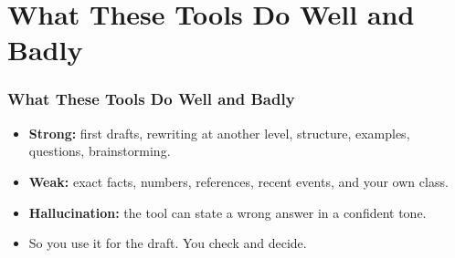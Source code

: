 



\section[Limits]{What These Tools Do Well and Badly}

\begin{frame}[fragile]\frametitle{What These Tools Do Well and Badly}
\begin{itemize}
\item \textbf{Strong:} first drafts, rewriting at another level, structure, examples, questions, brainstorming.
\item \textbf{Weak:} exact facts, numbers, references, recent events, and your own class.
\item \textbf{Hallucination:} the tool can state a wrong answer in a confident tone.
\item So you use it for the draft. You check and decide.
\end{itemize}
\end{frame}


